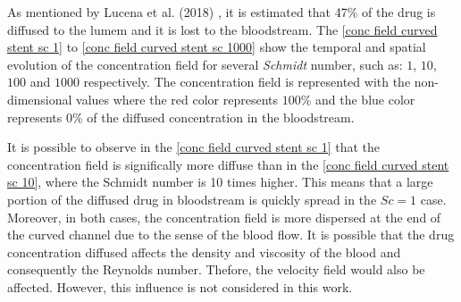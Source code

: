 \vspace{1cm}
As mentioned by Lucena et al. (2018) \cite{lucena2018}, 
it is estimated that 47\% of the drug is diffused to the 
lumem and it is lost to the bloodstream.
The \ref{conc field curved stent sc 1} to 
\ref{conc field curved stent sc 1000} show the temporal and spatial evolution 
of the concentration field for several \textit{Schmidt} number, 
such as: $1$, $10$, $100$ and $1000$ respectively. The concentration field is 
represented with the non-dimensional values where the red color 
represents $100$\% and the blue color represents $0$\% 
of the diffused concentration in the bloodstream. 

\medskip
It is possible to observe in the \ref{conc field curved stent sc 1}
that the concentration field is significally more diffuse than in the
\ref{conc field curved stent sc 10}, where the Schmidt number
is 10 times higher. This means that a large portion of the
diffused drug in bloodstream is quickly spread in the
$Sc=1$ case.
Moreover, in both cases, the concentration field
is more dispersed at the end of the curved channel due to
the sense of the blood flow. It is possible that the
drug concentration diffused affects the density and viscosity of the blood
and consequently the Reynolds number. Thefore, the velocity field would
also be affected. However, this influence is not considered in this work.



